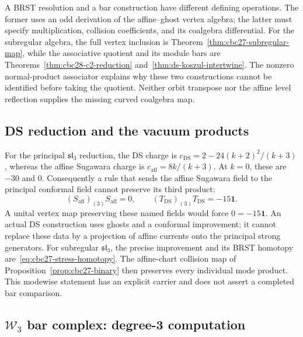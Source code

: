 \begin{remark}
\label{rem:ds-is-the-duality-datum}
A BRST resolution and a bar construction have different defining operations.
The former uses an odd derivation of the affine--ghost vertex algebra; the latter must specify multiplication, collision coefficients, and its coalgebra differential.
For the subregular algebra, the full vertex inclusion is Theorem~\ref{thm:cbc27-subregular-map}, while the associative quotient and its module bars are Theorems~\ref{thm:cbc28-c2-reduction} and~\ref{thm:ds-koszul-intertwine}.
The nonzero normal-product associator explains why these two constructions cannot be identified before taking the quotient.
Neither orbit transpose nor the affine level reflection supplies the missing curved coalgebra map.
\end{remark}

\subsection{DS reduction and the vacuum products}
\label{sec:ds-bar-intertwining}

\begin{computation}
\label{comp:ds-bar-sl3-w3}
For the principal $\mathfrak{sl}_3$ reduction, the DS charge is
$c_{\mathrm{DS}}=2-24(k+2)^2/(k+3)$, whereas the affine Sugawara charge is $c_{\mathrm{aff}}=8k/(k+3)$.
At $k=0$, these are $-30$ and $0$.
Consequently a rule that sends the affine Sugawara field to the principal conformal field cannot preserve its third product:
\[
 (S_{\mathrm{aff}})_{(3)}S_{\mathrm{aff}}=0,\qquad
 (T_{\mathrm{DS}})_{(3)}T_{\mathrm{DS}}=-15\mathbf1.
\]
A unital vertex map preserving these named fields would force $0=-15\mathbf1$.
An actual DS construction uses ghosts and a conformal improvement; it cannot replace these data by a projection of affine currents onto the principal strong generators.
For subregular $\mathfrak{sl}_3$, the precise improvement and its BRST homotopy are~\eqref{eq:cbc27-stress-homotopy}.
The affine-chart collision map of Proposition~\ref{prop:cbc27-binary} then preserves every individual mode product.
This modewise statement has an explicit carrier and does not assert a completed bar comparison.
\end{computation}

\subsection{\texorpdfstring{$\mathcal{W}_3$ bar complex: degree-3 computation}{W3 bar complex: degree-3 computation}}
\label{sec:w3-bar-degree3}

